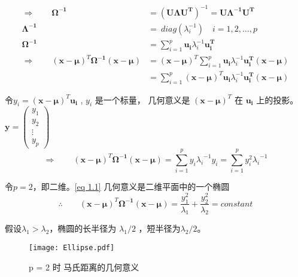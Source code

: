   \begin{align*}      
    \Longrightarrow \qquad \boldsymbol{\Omega^{-1}}  & = \boldsymbol{ \left( U \Lambda U^{T} \right) }^{-1} = \boldsymbol{U \Lambda^{-1} U^{T}} \\ 
    \boldsymbol{\Lambda^{-1}} &  = ~ diag(\lambda_{i}^{-1}) \quad i = 1 , 2 ,\ldots ,p \\
    \boldsymbol{\Omega^{-1}} &  = \sum_{i = 1}^{p} \boldsymbol{u_{i}} \lambda_{i}^{-1} \boldsymbol{u_{i}^{T}}  \\
    \Longrightarrow \qquad 
    {\left( \boldsymbol{x - \mu}  \right)}^{T} \boldsymbol{\Omega^{-1}} \left( \boldsymbol{x - \mu}  \right) 
    & =  {\left( \boldsymbol{x - \mu}  \right)}^{T}  \sum_{i = 1}^{p} \boldsymbol{u_{i}} \lambda_{i}^{-1} \boldsymbol{u_{i}^{T}}  
      \left( \boldsymbol{x - \mu}  \right) \\
    & =  \sum_{i = 1}^{p} {\left( \boldsymbol{x - \mu}  \right)}^{T}   \boldsymbol{u_{i}} \lambda_{i}^{-1} \boldsymbol{u_{i}^{T}} \left( \boldsymbol{x - \mu}  \right)  
  \end{align*}

  令$ y_{i} = {\left( \boldsymbol{x - \mu}  \right)}^{T}   \boldsymbol{u_{i}}$ ,  $ y_{i} $ 是一个标量， 几何意义是
  $ {\left( \boldsymbol{x - \mu}  \right)}^{T} $ 在 $ \boldsymbol{u_{i}}$ 上的投影。
$  \boldsymbol{y} = \begin{pmatrix}
        y_1 \\
        y_2 \\
        \vdots\\
        y_p
    \end{pmatrix}$
\[ \Longrightarrow \qquad {\left( \boldsymbol{x - \mu}  \right)}^{T} \boldsymbol{\Omega^{-1}} \left( \boldsymbol{x - \mu}  \right) 
              =   \sum_{i = 1}^{p} y_{i} {\lambda_{i}}^{-1} y_{i}  = \sum_{i = 1}^{p} y_{i}^{2} {\lambda_{i}}^{-1} \]

   令$p = 2$，即二维。\eqref{eq 1.1} 几何意义是二维平面中的一个椭圆
   \begin{equation} 
        \therefore \qquad {\left( \boldsymbol{x - \mu}  \right)}^{T} \boldsymbol{\Omega^{-1}} \left( \boldsymbol{x - \mu}  \right) 
                =  \frac{y_{1}^{2} }{\lambda_{1}} + \frac{y_{2}^{2} }{\lambda_{2}} = constant 
        \label{eq 1.1}
   \end{equation}
   
   假设$\lambda_{1} > \lambda_{2} $，椭圆的长半径为 $\lambda_{1} /2 $ ，短半径为$\lambda_{2} /2 $。
   \begin{figure}[ht]
    \centering
    \texttt{[image: Ellipse.pdf]}
    \caption{ p = 2 时 马氏距离的几何意义}
   \end{figure}

